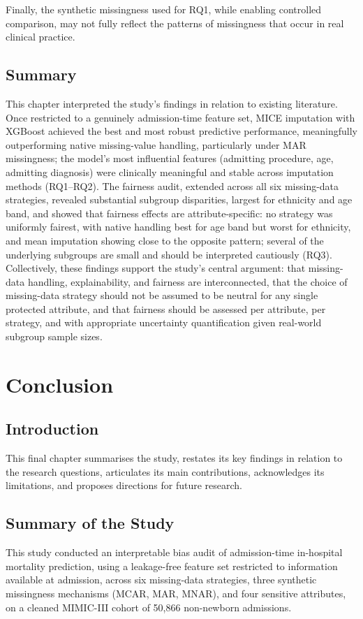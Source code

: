 \documentclass[12pt,a4paper]{report}
\begin{document}
Finally, the synthetic missingness used for RQ1, while enabling controlled comparison, may not fully reflect the patterns of missingness that occur in real clinical practice.


\section{Summary}
This chapter interpreted the study's findings in relation to existing literature. Once restricted to a genuinely admission-time feature set, MICE imputation with XGBoost achieved the best and most robust predictive performance, meaningfully outperforming native missing-value handling, particularly under MAR missingness; the model's most influential features (admitting procedure, age, admitting diagnosis) were clinically meaningful and stable across imputation methods (RQ1--RQ2). The fairness audit, extended across all six missing-data strategies, revealed substantial subgroup disparities, largest for ethnicity and age band, and showed that fairness effects are attribute-specific: no strategy was uniformly fairest, with native handling best for age band but worst for ethnicity, and mean imputation showing close to the opposite pattern; several of the underlying subgroups are small and should be interpreted cautiously (RQ3). Collectively, these findings support the study's central argument: that missing-data handling, explainability, and fairness are interconnected, that the choice of missing-data strategy should not be assumed to be neutral for any single protected attribute, and that fairness should be assessed per attribute, per strategy, and with appropriate uncertainty quantification given real-world subgroup sample sizes.


\chapter{Conclusion}

\section{Introduction}
This final chapter summarises the study, restates its key findings in relation to the research questions, articulates its main contributions, acknowledges its limitations, and proposes directions for future research.


\section{Summary of the Study}
This study conducted an interpretable bias audit of admission-time in-hospital mortality prediction, using a leakage-free feature set restricted to information available at admission, across six missing-data strategies, three synthetic missingness mechanisms (MCAR, MAR, MNAR), and four sensitive attributes, on a cleaned MIMIC-III cohort of 50,866 non-newborn admissions.
\end{document}
